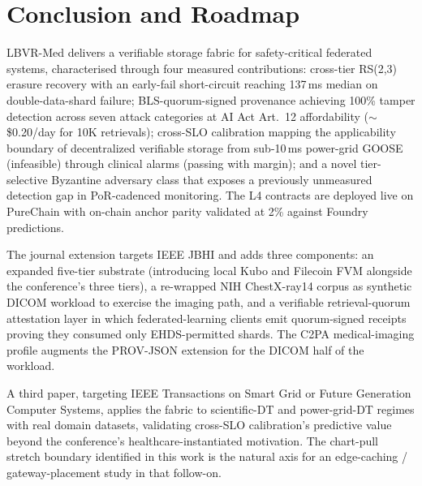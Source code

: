 \section{Conclusion and Roadmap}
\label{sec:conclusion}

LBVR-Med delivers a verifiable storage fabric for safety-critical federated systems, characterised through four measured contributions: cross-tier RS(2,3) erasure recovery with an early-fail short-circuit reaching 137\,ms median on double-data-shard failure; BLS-quorum-signed provenance achieving 100\% tamper detection across seven attack categories at AI Act Art.\ 12 affordability ($\sim$\$0.20/day for 10K retrievals); cross-SLO calibration mapping the applicability boundary of decentralized verifiable storage from sub-10\,ms power-grid GOOSE (infeasible) through clinical alarms (passing with margin); and a novel tier-selective Byzantine adversary class that exposes a previously unmeasured detection gap in PoR-cadenced monitoring. The L4 contracts are deployed live on PureChain with on-chain anchor parity validated at 2\% against Foundry predictions.

The journal extension targets IEEE JBHI and adds three components: an expanded five-tier substrate (introducing local Kubo and Filecoin FVM alongside the conference's three tiers), a re-wrapped NIH ChestX-ray14 corpus as synthetic DICOM workload to exercise the imaging path, and a verifiable retrieval-quorum attestation layer in which federated-learning clients emit quorum-signed receipts proving they consumed only EHDS-permitted shards. The C2PA medical-imaging profile augments the PROV-JSON extension for the DICOM half of the workload.

A third paper, targeting IEEE Transactions on Smart Grid or Future Generation Computer Systems, applies the fabric to scientific-DT and power-grid-DT regimes with real domain datasets, validating cross-SLO calibration's predictive value beyond the conference's healthcare-instantiated motivation. The chart-pull stretch boundary identified in this work is the natural axis for an edge-caching / gateway-placement study in that follow-on.
